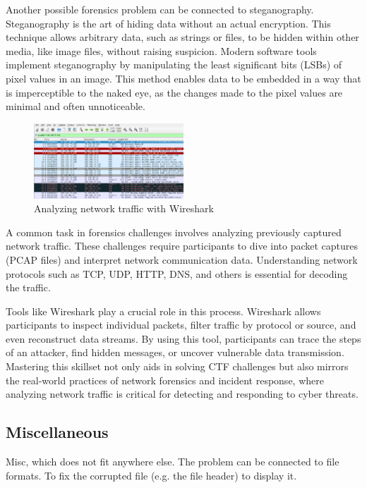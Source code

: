 \documentclass[conference]{IEEEtran}
\begin{document}
Another possible forensics problem can be connected to steganography.
Steganography is the art of hiding data without an actual encryption.
This technique allows arbitrary data, such as strings or files, to be hidden
within other media, like image files, without raising suspicion.
Modern software tools implement steganography by manipulating the least
significant bits (LSBs) of pixel values in an image. This method enables data
to be embedded in a way that is imperceptible to the naked eye, as the changes
made to the pixel values are minimal and often unnoticeable.
\cite{morkel2005}

\begin{figure}[htbp]
	\centering
	\includegraphics[width=0.5\textwidth]{fig/wireshark.png}
	\caption{Analyzing network traffic with Wireshark}
	\label{fig-wireshark}
\end{figure}

A common task in forensics challenges involves analyzing previously captured
network traffic. These challenges require participants to dive into packet
captures (PCAP files) and interpret network communication data.
Understanding network
protocols such as TCP, UDP, HTTP, DNS, and others is essential for decoding the
traffic.

Tools like Wireshark
\cite{ndatinya2015}
play a crucial role in this process. Wireshark allows
participants to inspect individual packets, filter traffic by protocol or
source, and even reconstruct data streams. By using this tool, participants can
trace the steps of an attacker, find hidden messages, or uncover vulnerable
data transmission. Mastering this skillset not only aids in solving CTF
challenges but also mirrors the real-world practices of network forensics and
incident response, where analyzing network traffic is critical for detecting
and responding to cyber threats.



\subsection{Miscellaneous}

Misc, which does not fit anywhere else.
The problem can be connected to file formats. To fix the corrupted file (e.g. the file header)
to display it.
\end{document}
